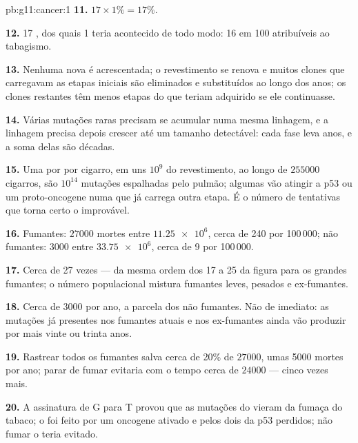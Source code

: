 \begin{solution}{pb:g11:cancer:1}
\textbf{11.} $17 \times 1\% = 17\%$.

\textbf{12.} 17 , dos quais 1 teria acontecido de todo modo: 16
em 100 atribuíveis ao tabagismo.

\textbf{13.} Nenhuma  nova é acrescentada; o revestimento se
renova e muitos clones que carregavam as etapas iniciais são
eliminados e substituídos ao longo dos anos; os clones restantes têm
menos etapas do que teriam adquirido se ele continuasse.

\textbf{14.} Várias mutações raras precisam se acumular numa mesma
linhagem, e a linhagem precisa depois crescer até um tamanho
detectável: cada fase leva anos, e a soma delas são décadas.

\textbf{15.} Uma  por  por cigarro, em uns $10^9$ 
do revestimento, ao longo de $\num{255000}$ cigarros, são $10^{14}$
mutações espalhadas pelo pulmão; algumas vão atingir a p53 ou um
proto-oncogene numa  que já carrega outra etapa. É o número de
tentativas que torna certo o improvável.

\textbf{16.} Fumantes: $\num{27000}$ mortes entre $\num{11.25e6}$,
cerca de 240 por 100\,000; não fumantes: 3000 entre $\num{33.75e6}$,
cerca de 9 por 100\,000.

\textbf{17.} Cerca de 27 vezes --- da mesma ordem dos 17 a 25 da figura
para os grandes fumantes; o número populacional mistura fumantes leves,
pesados e ex-fumantes.

\textbf{18.} Cerca de 3000 por ano, a parcela dos não fumantes. Não de
imediato: as mutações já presentes nos fumantes atuais e nos
ex-fumantes ainda vão produzir  por mais vinte ou trinta anos.

\textbf{19.} Rastrear todos os fumantes salva cerca de 20\% de
$\num{27000}$, umas 5000 mortes por ano; parar de fumar evitaria com o
tempo cerca de $\num{24000}$ --- cinco vezes mais.

\textbf{20.} A assinatura de G para T provou que as mutações do 
vieram da fumaça do tabaco; o  foi feito por um oncogene ativado
e pelos dois  da p53 perdidos; não fumar o teria evitado.
\end{solution}
